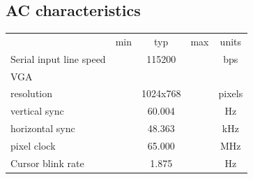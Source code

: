 \documentclass{article}
\newcommand{\heavyline}{\specialrule{1pt}{1pt}{1pt}}
\begin{document}
\subsection{AC characteristics}
\vspace{10 pt}

{\renewcommand{\arraystretch}{1.2}%
\begin{tabularx}{\linewidth}{Xcccc}
\heavyline
& min & typ & max & units \\ \heavyline

Serial input line speed & & 115200 & & bps \\ \hline

VGA & & & & \\
\hspace{10pt} resolution & & 1024x768 & & pixels \\
\hspace{10pt} vertical sync & & 60.004 & & Hz \\
\hspace{10pt} horizontal sync & & 48.363 & & kHz \\
\hspace{10pt} pixel clock & & 65.000 & & MHz \\ \hline

Cursor blink rate & & 1.875 & & Hz \\ \hline
\end{tabularx}}
\vspace{10 pt}
\end{document}
